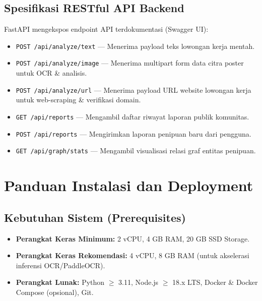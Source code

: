 \documentclass[12pt,a4paper]{article}
\begin{document}
\subsection{Spesifikasi RESTful API Backend}
FastAPI mengekspos endpoint API terdokumentasi (Swagger UI):
\begin{itemize}
    \item \texttt{POST /api/analyze/text} --- Menerima payload teks lowongan kerja mentah.
    \item \texttt{POST /api/analyze/image} --- Menerima multipart form data citra poster untuk OCR \& analisis.
    \item \texttt{POST /api/analyze/url} --- Menerima payload URL website lowongan kerja untuk web-scraping \& verifikasi domain.
    \item \texttt{GET /api/reports} --- Mengambil daftar riwayat laporan publik komunitas.
    \item \texttt{POST /api/reports} --- Mengirimkan laporan penipuan baru dari pengguna.
    \item \texttt{GET /api/graph/stats} --- Mengambil visualisasi relasi graf entitas penipuan.
\end{itemize}

\section{Panduan Instalasi dan Deployment}

\subsection{Kebutuhan Sistem (Prerequisites)}
\begin{itemize}
    \item \textbf{Perangkat Keras Minimum:} 2 vCPU, 4 GB RAM, 20 GB SSD Storage.
    \item \textbf{Perangkat Keras Rekomendasi:} 4 vCPU, 8 GB RAM (untuk akselerasi inferensi OCR/PaddleOCR).
    \item \textbf{Perangkat Lunak:} Python $\ge$ 3.11, Node.js $\ge$ 18.x LTS, Docker \& Docker Compose (opsional), Git.
\end{itemize}
\end{document}
